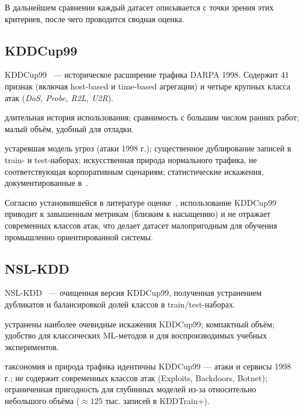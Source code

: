 В дальнейшем сравнении каждый датасет описывается с точки зрения этих
критериев, после чего проводится сводная оценка.

\subsection{KDDCup99}

KDDCup99~\cite{tavallaee2009nslkdd} --- историческое расширение трафика
DARPA 1998. Содержит 41 признак (включая host-based и time-based агрегации)
и четыре крупных класса атак (\emph{DoS, Probe, R2L, U2R}).

\begin{description}[font=\normalfont\itshape, leftmargin=1.5em]
    \item[Сильные стороны:] длительная история использования; сравнимость с
    большим числом ранних работ; малый объём, удобный для отладки.
    \item[Ограничения:] устаревшая модель угроз (атаки 1998 г.); существенное
    дублирование записей в train- и test-наборах; искусственная природа
    нормального трафика, не соответствующая корпоративным сценариям;
    статистические искажения, документированные в~\cite{tavallaee2009nslkdd,
    sommer2010outside}.
\end{description}

Согласно установившейся в литературе оценке~\cite{moustafa2016eval,
ferrag2020dlcyber}, использование KDDCup99 приводит к завышенным метрикам
(близким к насыщению) и не отражает современных классов атак, что делает
датасет малопригодным для обучения промышленно ориентированной системы.

\subsection{NSL-KDD}

NSL-KDD~\cite{tavallaee2009nslkdd} --- очищенная версия KDDCup99, полученная
устранением дубликатов и балансировкой долей классов в train/test-наборах.

\begin{description}[font=\normalfont\itshape, leftmargin=1.5em]
    \item[Сильные стороны:] устранены наиболее очевидные искажения KDDCup99;
    компактный объём; удобство для классических ML-методов и для
    воспроизводимых учебных экспериментов.
    \item[Ограничения:] таксономия и природа трафика идентичны KDDCup99 ---
    атаки и сервисы 1998 г.; не содержит современных классов атак (Exploits,
    Backdoors, Botnet); ограниченная пригодность для глубинных моделей из-за
    относительно небольшого объёма (\(\approx 125\) тыс. записей в KDDTrain+).
\end{description}

